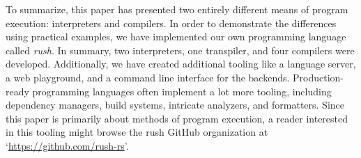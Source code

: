 To summarize, this paper has presented two entirely different means of program execution: interpreters and compilers.
In order to demonstrate the differences using practical examples,
we have implemented our own programming language called \emph{rush}.
In summary, two interpreters, one transpiler, and four compilers were developed.
Additionally, we have created additional tooling like a language server, a web playground, and a command line interface for the backends.
Production-ready programming languages often implement a lot more tooling, including dependency managers, build systems, intricate analyzers, and formatters.
Since this paper is primarily about methods of program execution, a reader interested in this tooling might browse the rush GitHub organization at `\url{https://github.com/rush-rs}'.
